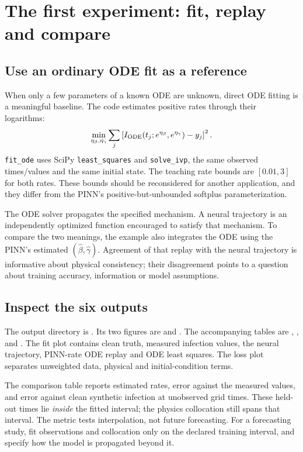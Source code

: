 \documentclass[11pt,a4paper]{article}
\theoremstyle{definition}
\theoremstyle{remark}
\begin{document}
\section{The first experiment: fit, replay and compare}
\subsection{Use an ordinary ODE fit as a reference}
When only a few parameters of a known ODE are unknown, direct ODE fitting is a meaningful baseline. The code estimates positive rates through their logarithms:
\begin{equation}
\min_{\eta_\beta,\eta_\gamma}\sum_j
\left[I_{\rm ODE}(t_j;e^{\eta_\beta},e^{\eta_\gamma})-y_j\right]^2.
\end{equation}
\texttt{fit\_ode} uses SciPy \texttt{least\_squares} and \texttt{solve\_ivp}, the same observed times/values and the same initial state. The teaching rate bounds are $[0.01,3]$ for both rates. These bounds should be reconsidered for another application, and they differ from the PINN's positive-but-unbounded softplus parameterization.

The ODE solver propagates the specified mechanism. A neural trajectory is an independently optimized function encouraged to satisfy that mechanism. To compare the two meanings, the example also integrates the ODE using the PINN's estimated $(\hat\beta,\hat\gamma)$. Agreement of that replay with the neural trajectory is informative about physical consistency; their disagreement points to a question about training accuracy, information or model assumptions.

\subsection{Inspect the six outputs}
The output directory is . Its two figures are  and . The accompanying tables are , ,  and . The fit plot contains clean truth, measured infection values, the neural trajectory, PINN-rate ODE replay and ODE least squares. The loss plot separates unweighted data, physical and initial-condition terms.

The comparison table reports estimated rates, error against the measured values, and error against clean synthetic infection at unobserved grid times. These held-out times lie \emph{inside} the fitted interval; the physics collocation still spans that interval. The metric tests interpolation, not future forecasting. For a forecasting study, fit observations and collocation only on the declared training interval, and specify how the model is propagated beyond it.
\end{document}
